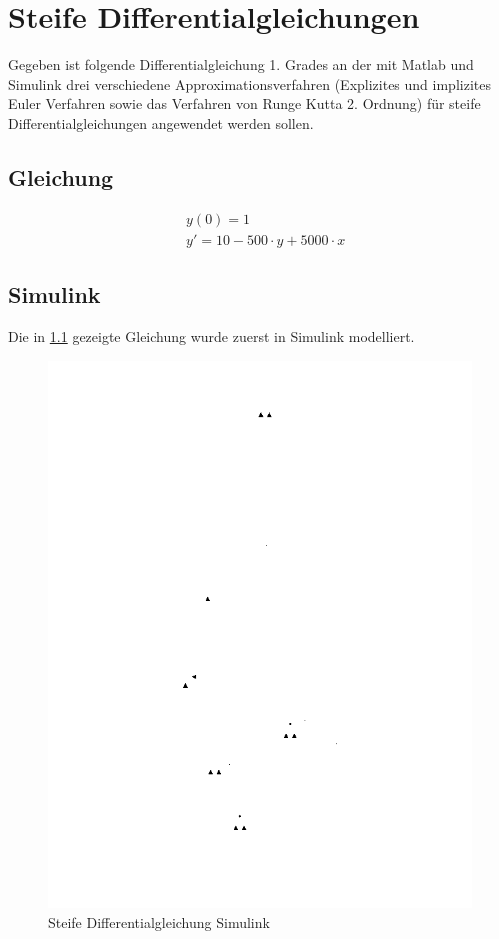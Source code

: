 \documentclass[10pt]{scrartcl}
\author{Oliver Steenbuck, Karolina Bernat}
\title{\titletext}
\date{31.10.2012}
\begin{document}
\maketitle
\setcounter{tocdepth}{3}
\tableofcontents
\listoffigures
\lstlistoflistings


\section{Steife Differentialgleichungen}
Gegeben ist folgende Differentialgleichung 1. Grades an der mit Matlab und Simulink drei verschiedene Approximationsverfahren (Explizites und implizites Euler Verfahren sowie das Verfahren von Runge Kutta 2. Ordnung) für steife Differentialgleichungen angewendet werden sollen.
\subsection{Gleichung} \label{aufg1Gleich}
	\begin{align}
		&y(0)=1\\
		&y'=10-500 \cdot y + 5000 \cdot x
	\end{align}
	
	
	\subsection{Simulink}
	Die in \ref{aufg1Gleich} gezeigte Gleichung wurde zuerst in Simulink modelliert.
		\begin{figure}[H]
			\centering	
			\includegraphics[width=\textwidth, angle=-90]{Prak1Aufg1Simulink.png}
            \caption{Steife Differentialgleichung Simulink}
            \label{pic:lorenzSimulink}
		\end{figure} 	
	
\end{document}
